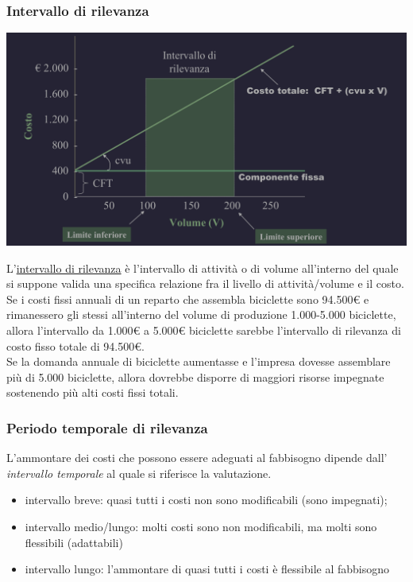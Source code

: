 \documentclass{article}
\begin{document}
\subsubsection{Intervallo di rilevanza}
\begin{center}
    \includegraphics[scale=0.3]{Image/CostoUni_2.png}
\end{center}
L'\underline{intervallo di rilevanza} è l'intervallo di attività o di volume all'interno del quale si suppone valida una specifica relazione fra il livello di attività/volume e il costo.
\vspace*{0.2cm}\\
Se i costi fissi annuali di un reparto che assembla biciclette sono 94.500€ e rimanessero gli stessi all'interno del volume di produzione 1.000-5.000 biciclette, allora l'intervallo da 1.000€ a 5.000€ biciclette sarebbe l'intervallo di rilevanza di costo fisso totale di 94.500€.\\
Se la domanda annuale di biciclette aumentasse e l'impresa dovesse assemblare più di 5.000 biciclette, allora dovrebbe disporre di maggiori risorse impegnate sostenendo più alti costi fissi totali.


\subsubsection{Periodo temporale di rilevanza}
L'ammontare dei costi che possono essere adeguati al fabbisogno dipende dall' \textit{intervallo temporale} al quale si riferisce la valutazione.
\begin{itemize}
    \item intervallo breve: quasi tutti i costi non sono modificabili (sono impegnati);
    \item intervallo medio/lungo: molti costi sono non modificabili, ma molti sono flessibili (adattabili)
    \item intervallo lungo: l'ammontare di quasi tutti i costi è flessibile al fabbisogno
\end{itemize}
\end{document}
